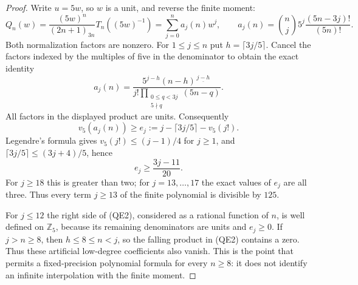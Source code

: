 \documentclass[11pt]{article}
\begin{document}
\begin{proof}
Write $u=5w$, so $w$ is a unit, and reverse the finite moment:
\[
 Q_n(w)=\frac{(5w)^n}{(2n+1)_{3n}}T_n((5w)^{-1})
       =\sum_{j=0}^n a_j(n)w^j,\qquad
 a_j(n)=\binom nj5^j\frac{(5n-3j)!}{(5n)!}.
                                                        \tag{QE1}
\]
Both normalization factors are nonzero. For $1\le j\le n$ put
$h=\lceil3j/5\rceil$. Cancel the factors indexed by the multiples
of five in the denominator to obtain the exact identity
\[
 a_j(n)=
 \frac{5^{j-h}(n-h)^{\underline{\,j-h\,}}}
 {j!\displaystyle\prod_{\substack{0\le q<3j\\5\nmid q}}(5n-q)}.
                                                        \tag{QE2}
\]
All factors in the displayed product are units. Consequently
\[
 v_5(a_j(n))\ge e_j:=j-\lceil3j/5\rceil-v_5(j!).
                                                        \tag{QE3}
\]
Legendre's formula gives $v_5(j!)\le(j-1)/4$ for $j\ge1$,
and $\lceil3j/5\rceil\le(3j+4)/5$, hence
\[
 e_j\ge\frac{3j-11}{20}.
                                                        \tag{QE4}
\]
For $j\ge18$ this is greater than two; for $j=13,\ldots,17$
the exact values of $e_j$ are all three. Thus every term
$j\ge13$ of the finite polynomial is divisible by $125$.

For $j\le12$ the right side of (QE2), considered as a rational
function of $n$, is well defined on $\mathbb Z_5$, because its
remaining denominators are units and $e_j\ge0$.
If $j>n\ge8$, then $h\le8\le n<j$, so the falling product in
(QE2) contains a zero. Thus these artificial low-degree
coefficients also vanish. This is the point that permits a
fixed-precision polynomial formula for every $n\ge8$: it does
not identify an infinite interpolation with the finite moment.


\end{proof}
\end{document}
